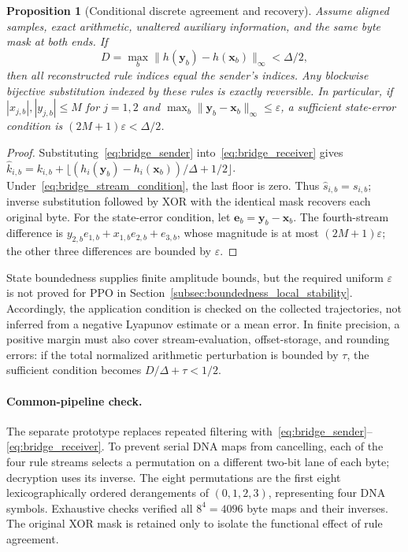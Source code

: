 \documentclass[a4paper,fleqn]{cas-sc}
\theoremstyle{plain}
\newtheorem{proposition}{Proposition}[section]
\theoremstyle{definition}
\begin{document}
\begin{proposition}[Conditional discrete agreement and recovery]
\label{prop:discrete_recovery}
Assume aligned samples, exact arithmetic, unaltered auxiliary information, and the same byte mask at both ends. If
\begin{equation}
 D=\max_b\|h(\mathbf{y}_b)-h(\mathbf{x}_b)\|_\infty<\Delta/2,
\label{eq:bridge_stream_condition}
\end{equation}
then all reconstructed rule indices equal the sender's indices. Any blockwise bijective substitution indexed by these rules is exactly reversible. In particular, if $|x_{j,b}|,|y_{j,b}|\leq M$ for $j=1,2$ and $\max_b\|\mathbf{y}_b-\mathbf{x}_b\|_\infty\leq\varepsilon$, a sufficient state-error condition is $(2M+1)\varepsilon<\Delta/2$.
\end{proposition}

\begin{proof}
Substituting~\eqref{eq:bridge_sender} into~\eqref{eq:bridge_receiver} gives $\widehat k_{i,b}=k_{i,b}+\lfloor (h_i(\mathbf{y}_b)-h_i(\mathbf{x}_b))/\Delta+1/2\rfloor$. Under~\eqref{eq:bridge_stream_condition}, the last floor is zero. Thus $\widehat s_{i,b}=s_{i,b}$; inverse substitution followed by XOR with the identical mask recovers each original byte. For the state-error condition, let $\mathbf{e}_b=\mathbf{y}_b-\mathbf{x}_b$. The fourth-stream difference is $y_{2,b}e_{1,b}+x_{1,b}e_{2,b}+e_{3,b}$, whose magnitude is at most $(2M+1)\varepsilon$; the other three differences are bounded by $\varepsilon$.
\end{proof}

State boundedness supplies finite amplitude bounds, but the required uniform $\varepsilon$ is not proved for PPO in Section~\ref{subsec:boundedness_local_stability}. Accordingly, the application condition is checked on the collected trajectories, not inferred from a negative Lyapunov estimate or a mean error. In finite precision, a positive margin must also cover stream-evaluation, offset-storage, and rounding errors: if the total normalized arithmetic perturbation is bounded by $\tau$, the sufficient condition becomes $D/\Delta+\tau<1/2$.

\paragraph{Common-pipeline check.}
The separate prototype replaces repeated filtering with~\eqref{eq:bridge_sender}--\eqref{eq:bridge_receiver}. To prevent serial DNA maps from cancelling, each of the four rule streams selects a permutation on a different two-bit lane of each byte; decryption uses its inverse. The eight permutations are the first eight lexicographically ordered derangements of $(0,1,2,3)$, representing four DNA symbols. Exhaustive checks verified all $8^4=4096$ byte maps and their inverses. The original XOR mask is retained only to isolate the functional effect of rule agreement.
\end{document}
